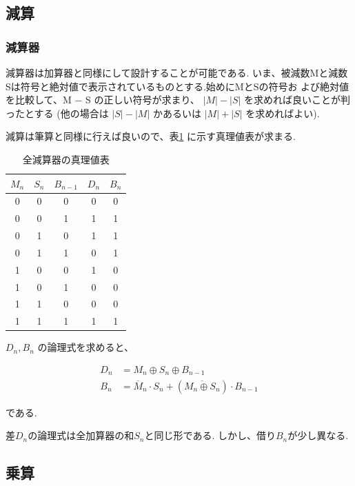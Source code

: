 \documentclass[titlepage]{jsarticle}
\theoremstyle{definition}
\begin{document}
\subsection{減算}

\subsubsection{減算器}
減算器は加算器と同様にして設計することが可能である.
いま、被減数Mと減数Sは符号と絶対値で表示されているものとする.始めにMとSの符号お
よび絶対値を比較して、M − S の正しい符号が求まり、
$\lvert M \rvert − \lvert S \rvert$ を求めれば良いことが判ったとする (他の場合は
$\lvert S \rvert − \lvert M \rvert$ かあるいは $\lvert M \rvert + \lvert S \rvert$ を求めればよい).


減算は筆算と同様に行えば良いので、表\ref{zengenzan1} に示す真理値表が求まる.


\begin{table}[htbp]
	\caption{全減算器の真理値表}
	\label{zengenzan1}
	\centering
	\begin{tabular}{|c|c|c||c|c|} \hline
		$M_n$ & $S_n$ & $B_{n-1}$ & $D_n$ & $B_n$ \\ \hline \hline
		0 & 0 & 0 & 0 & 0 \\ \hline
		0 & 0 & 1 & 1 & 1 \\ \hline
		0 & 1 & 0 & 1 & 1 \\ \hline
		0 & 1 & 1 & 0 & 1 \\ \hline
		1 & 0 & 0 & 1 & 0 \\ \hline
		1 & 0 & 1 & 0 & 0 \\ \hline
		1 & 1 & 0 & 0 & 0 \\ \hline
		1 & 1 & 1 & 1 & 1 \\ \hline
	\end{tabular}
\end{table}



$D_n, B_n$ の論理式を求めると、

\begin{align}
	D_n &= M_n \oplus S_n \oplus B_{n-1} \\
	B_n &= \overline{M}_n \cdot S_n + (\overline{M_n \oplus S_n}) \cdot B_{n-1}
\end{align}

である.

差$D_n$の論理式は全加算器の和$S_n$と同じ形である.
しかし、借り$B_n$が少し異なる.



\subsection{乗算}
\end{document}
